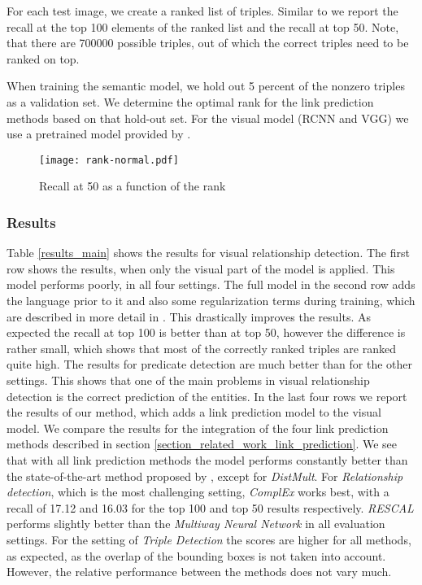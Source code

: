 \documentclass[runningheads,a4paper]{llncs}
\begin{document}
\noindent For each test image, we create a ranked list of triples. Similar to \cite{visual} we report the recall at the top 100 elements of the ranked list and the recall at top 50. Note, that there are 700000 possible triples, out of which the correct triples need to be ranked on top. 

When training the semantic model, we hold out 5 percent of the nonzero triples as a validation set. We determine the optimal rank for the link prediction methods based on that hold-out set. For the visual model (RCNN and VGG) we use a pretrained model provided by \cite{visual}.

\begin{figure}[t]
\centering
    \texttt{[image: rank-normal.pdf]}
    \caption{Recall at 50 as a function of the rank}
    \label{fig_rank_normal}
\end{figure}



\subsubsection{Results}
Table \ref{results_main} shows the results for visual relationship detection. The first row shows the results, when only the visual part of the model is applied. This model performs poorly, in all four settings. The full model in the second row adds the language prior to it and also some regularization terms during training, which are described in more detail in \cite{visual}. This drastically improves the results. As expected the recall at top 100 is better than at top 50, however the difference is rather small, which shows that most of the correctly ranked triples are ranked quite high. The results for predicate detection are much better than for the other settings. This shows that one of the main problems in visual relationship detection is the correct prediction of the entities. In the last four rows we report the results of our method, which adds a link prediction model to the visual model. We compare the results for the integration of the four link prediction methods described in section \ref{section_related_work_link_prediction}. We see that with all link prediction methods the model performs constantly better than the state-of-the-art method proposed by \cite{visual}, except for \textit{DistMult}. For \textit{Relationship detection}, which is the most challenging setting, \textit{ComplEx} works best, with a recall of 17.12 and 16.03 for the top 100 and top 50 results respectively. \textit{RESCAL} performs slightly better than the \textit{Multiway Neural Network} in all evaluation settings. For the setting of \textit{Triple Detection} the scores are higher for all methods, as expected, as the overlap of the bounding boxes is not taken into account. However, the relative performance between the methods does not vary much.
\end{document}
